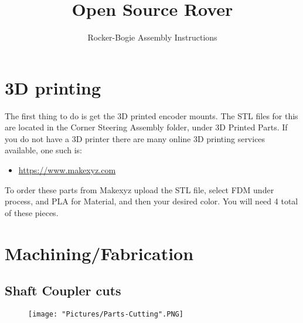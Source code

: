 \documentclass[12pt]{article}
\begin{document}
\title{Open Source Rover}
\author{Rocker-Bogie Assembly Instructions}

\makeatletter         
\def\@maketitle{
\begin{center}	
	\makebox[\textwidth][c]{ \texttt{[image: "Pictures/Corner Title".png]}}
	{\Huge \bfseries \sffamily \@title }\\[4ex] 
	{\huge \bfseries \sffamily \@author}\\[4ex] 
	\texttt{[image: "Pictures/JPL logo".png]}
\end{center}}
\makeatother

\maketitle


\newpage

\tableofcontents


\section{3D printing}
The first thing to do is get the 3D printed encoder mounts. The STL files for this are located in the Corner Steering Assembly folder, under 3D Printed Parts. If you do not have a 3D printer there are many online 3D printing services available, one such is:

\begin{itemize}
	\item \href{https://www.makexyz.com}{https://www.makexyz.com}
\end{itemize}

To order these parts from Makexyz upload the STL file, select FDM under process, and PLA for Material, and then your desired color. You will need 4 total of these pieces. 

\section{Machining/Fabrication}
\subsection{Shaft Coupler cuts}

\begin{figure}[H]
	\centering
	\texttt{[image: "Pictures/Parts-Cutting".PNG]}
\end{figure}
\end{document}
